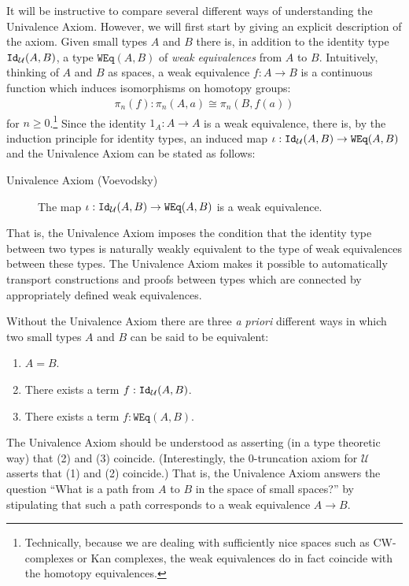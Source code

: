 \documentclass{amsart}
\newcommand{\UU}{\mathcal{U}}
\newcommand{\iso}{\cong}
\newcommand{\id}[1]{\textnormal{\texttt{Id}}_{#1}}
\newcommand{\weq}{\texttt{WEq}}
\theoremstyle{definition}
\theoremstyle{remark}
\numberwithin{equation}{section}
\begin{document}
It will be instructive to compare several different ways of
understanding the Univalence Axiom.  However, we will first start by
giving an explicit description of the axiom.  Given small types $A$
and $B$ there is, in addition to the identity
type $\id{\UU}(A,B)$, a type $\weq(A,B)$ of \emph{weak equivalences}
from $A$ to $B$.  Intuitively, thinking of $A$ and $B$ as spaces, a
weak equivalence $f:A\to B$ is a continuous function which induces
isomorphisms on homotopy groups: 
\begin{align*}
  \pi_{n}(f):\pi_{n}(A,a)\iso\pi_{n}(B,f(a))
\end{align*}
for $n\geq 0$.\footnote{Technically, because we are dealing with
  sufficiently nice spaces such as CW-complexes or Kan complexes, the
  weak equivalences do in fact coincide with the homotopy equivalences.}
Since the identity $1_{A}:A\to A$ is a weak equivalence, there is, by
the induction principle for identity types, an induced map
$\iota:\id{\UU}(A,B)\to\weq(A,B)$ and the Univalence Axiom can be
stated as follows:
\begin{description}
\item[Univalence Axiom \textnormal{(Voevodsky)}] The map $\iota:\id{\UU}(A,B)\to\weq(A,B)$
  is a weak equivalence.
\end{description}
That is, the Univalence Axiom imposes the condition that the identity
type between two types is naturally weakly equivalent to the type of
weak equivalences between these types.  The Univalence Axiom makes it
possible to automatically transport constructions and proofs between
types which are connected by appropriately defined weak
equivalences.

Without the Univalence Axiom there are three \emph{a priori} different ways in which two small types
$A$ and $B$ can be said to be equivalent:
\begin{enumerate}
\item $A=B$.
\item There exists a term $f:\id{\UU}(A,B)$.
\item There exists a term $f:\weq(A,B)$.
\end{enumerate}
The Univalence Axiom should be understood as asserting (in a type
theoretic way) that (2) and (3) coincide.  (Interestingly, the
0-truncation axiom for $\UU$ asserts that (1) and (2)
coincide.)  That is, the Univalence Axiom answers the question ``What is a path from $A$ to $B$ in
the space of small spaces?'' by stipulating that such a path
corresponds to a weak equivalence $A\to B$.  
\end{document}
